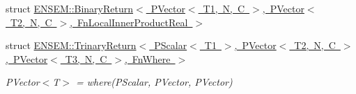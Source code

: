 \begin{DoxyCompactItemize}
struct \mbox{\hyperlink{structENSEM_1_1BinaryReturn_3_01PVector_3_01T1_00_01N_00_01C_01_4_00_01PVector_3_01T2_00_01N_00_ea08dc7f09ce8d8c0ce865f5402be2da}{E\+N\+S\+E\+M\+::\+Binary\+Return$<$ P\+Vector$<$ T1, N, C $>$, P\+Vector$<$ T2, N, C $>$, Fn\+Local\+Inner\+Product\+Real $>$}}
\item 
struct \mbox{\hyperlink{structENSEM_1_1TrinaryReturn_3_01PScalar_3_01T1_01_4_00_01PVector_3_01T2_00_01N_00_01C_01_4_00_0742a5a6fd91ed4d5b98fa11837210028}{E\+N\+S\+E\+M\+::\+Trinary\+Return$<$ P\+Scalar$<$ T1 $>$, P\+Vector$<$ T2, N, C $>$, P\+Vector$<$ T3, N, C $>$, Fn\+Where $>$}}
\begin{DoxyCompactList}\small\item\em P\+Vector$<$\+T$>$ = where(\+P\+Scalar, P\+Vector, P\+Vector) \end{DoxyCompactList}\end{DoxyCompactItemize}
